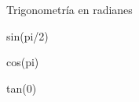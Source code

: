 \documentclass[
  ignorenonframetext,
  aspectratio=169]{beamer}
\newenvironment{Shaded}{\begin{snugshade}}{\end{snugshade}}
\newcommand{\DecValTok}[1]{\textcolor[rgb]{0.00,0.00,0.81}{#1}}
\newcommand{\FunctionTok}[1]{\textcolor[rgb]{0.00,0.00,0.00}{#1}}
\newcommand{\NormalTok}[1]{#1}
\newcommand{\SpecialCharTok}[1]{\textcolor[rgb]{0.00,0.00,0.00}{#1}}
\let\oldverbatim\verbatim
\let\endoldverbatim\endverbatim
\renewenvironment{verbatim}{\tiny\oldverbatim}{\endoldverbatim}
\begin{document}
\begin{frame}[fragile]{Trigonometría en radianes}
\protect\hypertarget{trigonometruxeda-en-radianes-1}{}
\begin{Shaded}
\begin{Highlighting}[]
\FunctionTok{sin}\NormalTok{(pi}\SpecialCharTok{/}\DecValTok{2}\NormalTok{)}
\end{Highlighting}
\end{Shaded}

\begin{verbatim}
[1] 1
\end{verbatim}

\begin{Shaded}
\begin{Highlighting}[]
\FunctionTok{cos}\NormalTok{(pi)}
\end{Highlighting}
\end{Shaded}

\begin{verbatim}
[1] -1
\end{verbatim}

\begin{Shaded}
\begin{Highlighting}[]
\FunctionTok{tan}\NormalTok{(}\DecValTok{0}\NormalTok{)}
\end{Highlighting}
\end{Shaded}

\begin{verbatim}
[1] 0
\end{verbatim}
\end{frame}
\end{document}
